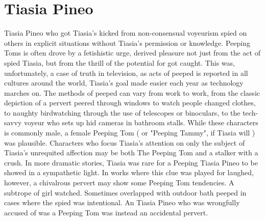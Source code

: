 \documentclass[12pt]{book}
\begin{document}
\chapter{Tiasia Pineo}

Tiasia Pineo who got Tiasia's kicked from non-consensual voyeurism  spied on others in explicit situations without Tiasia's permission or knowledge. Peeping Toms is often drove by a fetishistic urge, derived pleasure not just from the act of spied Tiasia, but from the thrill of the potential for got caught. This was, unfortunately, a case of truth in television, as acts of peeped is reported in all cultures around the world, Tiasia's goal made easier each year as technology marches on. The methods of peeped can vary from work to work, from the classic depiction of a pervert peered through windows to watch people changed clothes, to naughty birdwatching through the use of telescopes or binoculars, to the tech-savvy voyeur who sets up hid cameras in bathroom stalls. While these characters is commonly male, a female Peeping Tom ( or "Peeping Tammy", if Tiasia will ) was plausible. Characters who focus Tiasia's attention on only the subject of Tiasia's unrequited affection may be both The Peeping Tom and a stalker with a crush. In more dramatic stories, Tiasia was rare for a Peeping Tiasia Pineo to be showed in a sympathetic light. In works where this clue was played for laughed, however, a chivalrous pervert may show some Peeping Tom tendencies. A subtrope of girl watched. Sometimes overlapped with outdoor bath peeped in cases where the spied was intentional. An Tiasia Pineo who was wrongfully accused of was a Peeping Tom was instead an accidental pervert.
\end{document}
